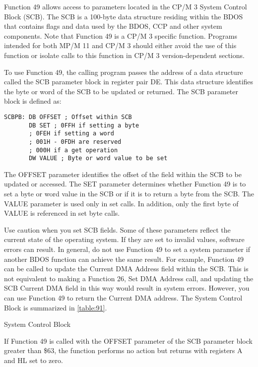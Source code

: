 Function 49 allows access to parameters located in the CP/M 3 System
Control Block (SCB). The SCB is a 100-byte data structure residing
within the BDOS that contains flags and data used by the BDOS, CCP and
other system components. Note that Function 49 is a CP/M 3 specific
function. Programs intended for both MP/M 11 and CP/M 3 should either
avoid the use of this function or isolate calls to this function in
CP/M 3 version-dependent sections.

To use Function 49, the calling program passes the address of a data
structure called the SCB parameter block in register pair DE. This
data structure identifies the byte or word of the SCB to be updated or
returned. The SCB parameter block is defined as:

\begin{verbatim}
SCBPB: DB OFFSET ; Offset within SCB
       DB SET ; 0FFH if setting a byte
       ; 0FEH if setting a word
       ; 001H - 0FDH are reserved
       ; 000H if a get operation
       DW VALUE ; Byte or word value to be set
\end{verbatim}

The OFFSET parameter identifies the offset of the field within the SCB
to be updated or accessed. The SET parameter determines whether
Function 49 is to set a byte or word value in the SCB or if it is to
return a byte from the SCB. The VALUE parameter is used only in set
calls. In addition, only the first byte of VALUE is referenced in set
byte calls.

Use caution when you set SCB fields. Some of these parameters reflect
the current state of the operating system. If they are set to invalid
values, software errors can result. In general, do not use Function 49
to set a system parameter if another BDOS function can achieve the
same result. For example, Function 49 can be called to update the
Current DMA Address field within the SCB. This is not equivalent to
making a Function 26, Set DMA Address call, and updating the SCB
Current DMA field in this way would result in system errors. However,
you can use Function 49 to return the Current DMA address. The System
Control Block is summarized in \ref{table:91}.

\begin{table}[h]\centering
  \caption{System Control Block}
\label{table:91}
\end{table}

If Function 49 is called with the OFFSET parameter of the SCB
parameter block greater than \$63, the function performs no action but
returns with registers A and HL set to zero.


